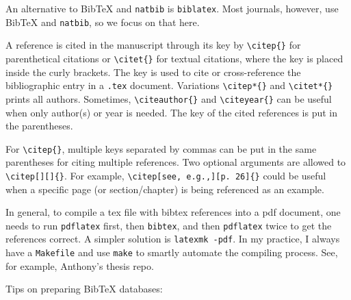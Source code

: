 \documentclass[
]{book}
\theoremstyle{definition}
\theoremstyle{definition}
\theoremstyle{definition}
\theoremstyle{definition}
\theoremstyle{remark}
\begin{document}
An alternative to BibTeX and \texttt{natbib} is \texttt{biblatex}. Most journals, however, use
BibTeX and \texttt{natbib}, so we focus on that here.

A reference is cited in the manuscript through its key by \texttt{\textbackslash{}citep\{\}} for
parenthetical citations or \texttt{\textbackslash{}citet\{\}} for textual citations, where the key is
placed inside the curly brackets. The key is used to cite or cross-reference the
bibliographic entry in a \texttt{.tex} document. Variations
\texttt{\textbackslash{}citep*\{\}} and \texttt{\textbackslash{}citet*\{\}} prints all authors. Sometimes, \texttt{\textbackslash{}citeauthor\{\}}
and \texttt{\textbackslash{}citeyear\{\}} can be useful when only author(s) or year is needed.
The key of the cited references is put in the parentheses.

For \texttt{\textbackslash{}citep\{\}}, multiple keys separated by commas can be put in the same
parentheses for citing
multiple references. Two optional arguments are allowed to \texttt{\textbackslash{}citep{[}{]}{[}{]}\{\}}.
For example, \texttt{\textbackslash{}citep{[}see,\ e.g.,{]}{[}p.\ 26{]}\{\}} could be useful when a specific page
(or section/chapter) is being referenced as an example.

In general, to compile a tex file with bibtex references into a pdf document,
one needs to run \texttt{pdflatex} first, then \texttt{bibtex}, and then \texttt{pdflatex} twice to
get the references correct. A simpler solution is \texttt{latexmk\ -pdf}. In my
practice, I always have a \texttt{Makefile} and use \texttt{make} to smartly automate the
compiling process. See, for example, Anthony's thesis repo.

Tips on preparing BibTeX databases:
\end{document}

